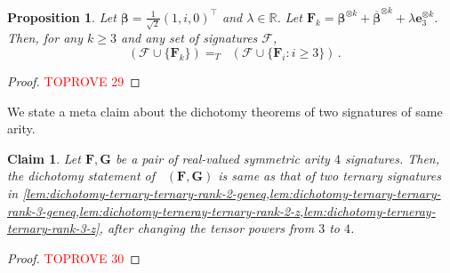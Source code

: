\documentclass[11pt]{article}
\newtheorem{proposition}[theorem]{Proposition}
\newtheorem{claim}{Claim}
\DeclareMathOperator{\holts}{Holant^*_3}
\newcommand{\transpose}{^\intercal}
\begin{document}
\begin{proposition}\label{prop:z-get-all-arity}
  Let $\boldsymbol{\beta} = \frac{1}{\sqrt{2}}(1, i, 0)\transpose$ and $\lambda \in \mathbb{R}$.
  Let $\mathbf{F}_k = \boldsymbol{\beta}^{\otimes k} + \overline{\boldsymbol{\beta}}^{\otimes k} + \lambda \mathbf{e}_3^{\otimes k}$.
  Then, for any $k \ge 3$ and any set of signatures $\mathscr{F}$,
  \[
    \holts(\mathscr{F} \cup \{\mathbf{F}_k\}) =_T \holts(\mathscr{F} \cup \{\mathbf{F}_i : i \ge 3\}) \, .
  \]
\end{proposition}
\begin{proof}\textcolor{red}{TOPROVE 29}\end{proof}

We state a meta claim about the dichotomy theorems of two signatures of same arity.
\begin{claim}\label{lem:meta-push-arity}
  Let $\mathbf{F}, \mathbf{G}$ be a pair of real-valued symmetric arity $4$ signatures.
  Then, the dichotomy statement of $\holts(\mathbf{F}, \mathbf{G})$ is same as that of two ternary signatures in \cref{lem:dichotomy-ternary-ternary-rank-2-geneq,lem:dichotomy-ternary-ternary-rank-3-geneq,lem:dichotomy-terneray-ternary-rank-2-z,lem:dichotomy-terneray-ternary-rank-3-z}, after changing the tensor powers from $3$ to $4$.
\end{claim}
\begin{proof}\textcolor{red}{TOPROVE 30}\end{proof}
\end{document}
